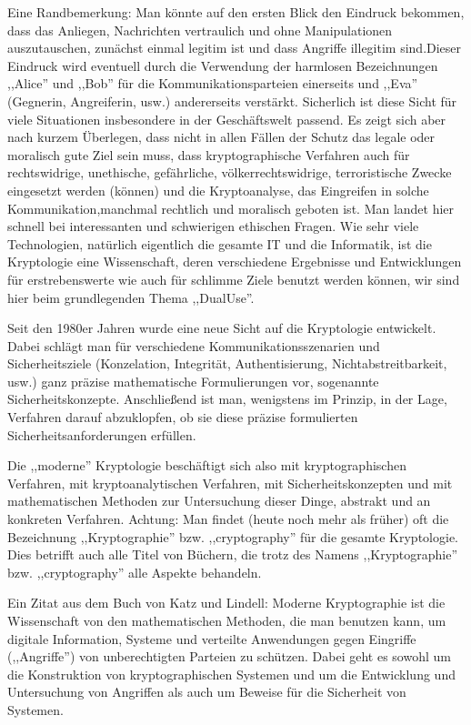 \documentclass[a4paper]{article}
\begin{document}
\begin{multicols}{3}
    Eine Randbemerkung: Man könnte auf den ersten Blick den Eindruck bekommen, dass das Anliegen,  Nachrichten vertraulich und ohne Manipulationen auszutauschen, zunächst einmal legitim ist und dass Angriffe illegitim sind.Dieser Eindruck wird eventuell durch die Verwendung der harmlosen Bezeichnungen ,,Alice'' und ,,Bob'' für die Kommunikationsparteien einerseits und ,,Eva'' (Gegnerin, Angreiferin, usw.) andererseits verstärkt. Sicherlich ist diese Sicht für viele Situationen insbesondere in der Geschäftswelt passend. Es zeigt sich aber nach kurzem Überlegen, dass nicht in allen Fällen der Schutz das legale oder moralisch gute Ziel sein muss, dass kryptographische Verfahren auch für rechtswidrige, unethische, gefährliche, völkerrechtswidrige, terroristische Zwecke eingesetzt werden (können) und die Kryptoanalyse, das Eingreifen in solche Kommunikation,manchmal rechtlich und moralisch geboten ist. Man landet hier schnell bei interessanten und schwierigen ethischen Fragen. Wie sehr viele Technologien, natürlich eigentlich die gesamte IT und die Informatik, ist die Kryptologie eine Wissenschaft, deren verschiedene Ergebnisse und Entwicklungen für erstrebenswerte wie auch für schlimme Ziele benutzt werden können, wir sind hier beim grundlegenden Thema ,,DualUse''.

    Seit den 1980er Jahren wurde eine neue Sicht auf die Kryptologie entwickelt. Dabei schlägt man für verschiedene Kommunikationsszenarien und Sicherheitsziele (Konzelation, Integrität, Authentisierung, Nichtabstreitbarkeit, usw.) ganz präzise mathematische Formulierungen vor, sogenannte Sicherheitskonzepte. Anschließend ist man, wenigstens im Prinzip, in der Lage, Verfahren darauf abzuklopfen, ob sie diese präzise formulierten Sicherheitsanforderungen erfüllen.

    Die ,,moderne'' Kryptologie beschäftigt sich also mit kryptographischen Verfahren, mit kryptoanalytischen Verfahren, mit Sicherheitskonzepten und mit mathematischen Methoden zur Untersuchung dieser Dinge, abstrakt und an konkreten Verfahren.
    Achtung: Man findet (heute noch mehr als früher) oft die Bezeichnung ,,Kryptographie'' bzw. ,,cryptography'' für die gesamte Kryptologie. Dies betrifft auch alle Titel von Büchern, die trotz des Namens ,,Kryptographie'' bzw. ,,cryptography'' alle Aspekte behandeln.

    Ein Zitat aus dem Buch von Katz und Lindell: Moderne Kryptographie ist die Wissenschaft von den mathematischen Methoden, die man benutzen kann, um digitale Information, Systeme und verteilte Anwendungen gegen Eingriffe (,,Angriffe'') von unberechtigten Parteien zu schützen. Dabei geht es sowohl um die Konstruktion von kryptographischen Systemen und um die Entwicklung und Untersuchung von Angriffen als auch um Beweise für die Sicherheit von Systemen.


\end{multicols}
\end{document}
